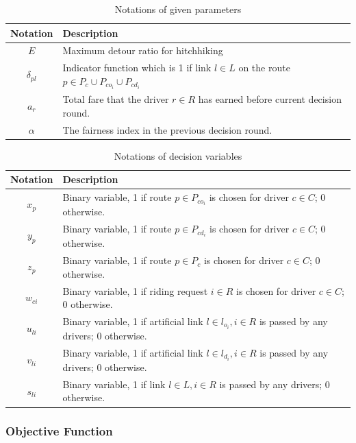 \renewcommand\arraystretch{1.5}
\par
\begin{table}[ht]
  \centering
  \caption{Notations of given parameters}
  \begin{tabularx}{\textwidth}{cX}
  \toprule
  Notation & Description \\
  \midrule
    $E$ & Maximum detour ratio for hitchhiking \\
    $\delta_{pl}$ & Indicator function which is 1 if link $l \in L$ on the route $p \in P_c \cup P_{co_i} \cup P_{cd_i}$ \\
    $a_r$ & Total fare that the driver $r \in R$ has earned before current decision round. \\
    $\alpha$ & The fairness index in the previous decision round. \\
  \bottomrule
  \end{tabularx}
\end{table}  
\par

\begin{table}[ht]
  \centering
  \caption{Notations of decision variables}
  \begin{tabularx}{\textwidth}{cX}
  \toprule
  Notation & Description \\
  \midrule
    $x_{p}$ & Binary variable, 1 if route $p \in P_{co_i}$ is chosen for driver $c \in C$; 0 otherwise. \\
    $y_{p}$ & Binary variable, 1 if route $p \in P_{cd_i}$ is chosen for driver $c \in C$; 0 otherwise. \\
    $z_{p}$ & Binary variable, 1 if route $p \in P_c$ is chosen for driver $c \in C$; 0 otherwise. \\
    $w_{ci}$ & Binary variable, 1 if riding request $i \in R$ is chosen for driver $c \in C$; 0 otherwise. \\
    $u_{li}$ & Binary variable, 1 if artificial link $l \in l_{o_i}, i \in R$ is passed by any drivers; 0 otherwise. \\
    $v_{li}$ & Binary variable, 1 if artificial link $l \in l_{d_i}, i \in R$ is passed by any drivers; 0 otherwise. \\
    $s_{li}$ & Binary variable, 1 if link $l \in L, i \in R$ is passed by any drivers; 0 otherwise. \\
  \bottomrule
  \end{tabularx}
\end{table}  
\newpage

\subsubsection*{Objective Function}

